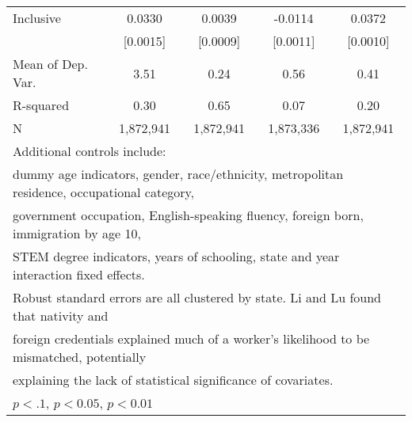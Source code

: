 \begin{table}[htbp]
\begin{tabular}{l*{4}{c}}
\addlinespace
Inclusive           &      0.0330\sym{***}&      0.0039\sym{***}&     -0.0114\sym{***}&      0.0372\sym{***}\\
                    &    [0.0015]         &    [0.0009]         &    [0.0011]         &    [0.0010]         \\
\midrule
Mean of Dep. Var.   &        3.51         &        0.24         &        0.56         &        0.41         \\
R-squared           &        0.30         &        0.65         &        0.07         &        0.20         \\
N                   &   1,872,941         &   1,872,941         &   1,873,336         &   1,872,941         \\
\bottomrule
\multicolumn{5}{l}{\footnotesize Additional controls include:}\\
\multicolumn{5}{l}{\footnotesize dummy age indicators, gender, race/ethnicity, metropolitan residence, occupational category,}\\
\multicolumn{5}{l}{\footnotesize government occupation, English-speaking fluency, foreign born, immigration by age 10,}\\
\multicolumn{5}{l}{\footnotesize STEM degree indicators, years of schooling, state and year interaction fixed effects.}\\
\multicolumn{5}{l}{\footnotesize Robust standard errors are all clustered by state. Li and Lu found that nativity and}\\
\multicolumn{5}{l}{\footnotesize foreign credentials explained much of a worker's likelihood to be mismatched, potentially}\\
\multicolumn{5}{l}{\footnotesize explaining the lack of statistical significance of covariates.}\\
\multicolumn{5}{l}{\footnotesize \sym{*} \(p<.1\), \sym{**} \(p<0.05\), \sym{***} \(p<0.01\)}\\
\end{tabular}
\end{table}
